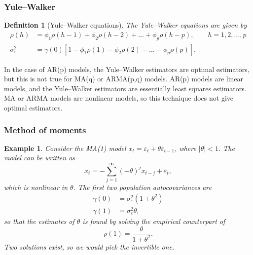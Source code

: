 \documentclass[
paper=128mm:96mm, %
fontsize=9.5pt, %
pagesize, %
parskip=half-, %
]{scrartcl} %
\theoremstyle{mythmstyle} %
\newtheorem{definition}[theorem]{Definition} %
\newtheorem{example}[theorem]{Example} %
\begin{document}
\clearpage




\subsubsection{Yule--Walker}

\begin{definition}[Yule--Walker equations]
The Yule--Walker equations are given by
%
\begin{align}
\rho(h)&=\phi_1\rho(h-1)+\phi_2\rho(h-2)+\dots+\phi_p\rho(h-p),\qquad h=1,2,\dots,p\nonumber\\
%
\sigma_\varepsilon^2&=\gamma(0)\left[1-\phi_1\rho(1)-\phi_2\rho(2)-\dots-\phi_p\rho(p)\right].\nonumber
\end{align}
%
\end{definition}
%
In the case of AR(p) models, the Yule--Walker estimators are optimal estimators, but this is not true for MA(q) or ARMA(p,q) models. AR(p) models are linear models, and the Yule--Walker estimators are essentially least squares estimators. MA or ARMA models are nonlinear models, so this technique does not give optimal estimators.



\clearpage



\subsubsection{Method of moments}

\begin{example}
Consider the MA(1) model $x_t= \varepsilon_t+\theta\varepsilon_{t-1}$, where $\vert\theta\vert<1$. The model can be written as
%
\begin{equation}
x_t=-\sum_{j=1}^\infty(-\theta)^jx_{t-j}+\varepsilon_t\nonumber,
\end{equation}
which is nonlinear in $\theta$. The first two population autocovariances are 
\begin{align}
\gamma(0)&=\sigma^2_\varepsilon\left(1+\theta^2\right)\nonumber\\
\gamma(1)&=\sigma^2_\varepsilon\theta,\nonumber
\end{align}
so that the estimates of $\theta$ is found by solving the empirical counterpart of
\begin{equation}
\rho(1)=\frac{\theta}{1+\theta^2}.\nonumber
\end{equation}
Two solutions exist, so we would pick the invertible one.
\end{example}
\clearpage
\end{document}
